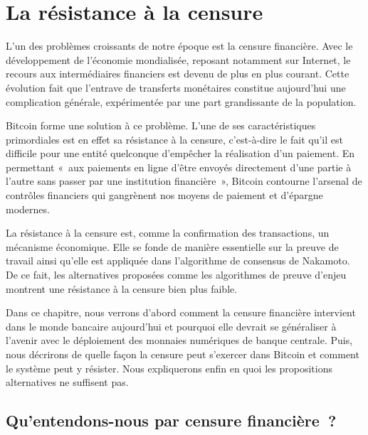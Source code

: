 
\chapter{La résistance à la censure}
\label{ch:censure}

L'un des problèmes croissants de notre époque est la censure financière. Avec le développement de l'économie mondialisée, reposant notamment sur Internet, le recours aux intermédiaires financiers est devenu de plus en plus courant. Cette évolution fait que l'entrave de transferts monétaires constitue aujourd'hui une complication générale, expérimentée par une part grandissante de la population.

Bitcoin forme une solution à ce problème. L'une de ses caractéristiques primordiales est en effet sa résistance à la censure, c'est-à-dire le fait qu'il est difficile pour une entité quelconque d'empêcher la réalisation d'un paiement. En permettant «~aux paiements en ligne d'être envoyés directement d'une partie à l'autre sans passer par une institution financière~», Bitcoin contourne l'arsenal de contrôles financiers qui gangrènent nos moyens de paiement et d'épargne modernes.

La résistance à la censure est, comme la confirmation des transactions, un mécanisme économique. Elle se fonde de manière essentielle sur la preuve de travail ainsi qu'elle est appliquée dans l'algorithme de consensus de Nakamoto. De ce fait, les alternatives proposées comme les algorithmes de preuve d'enjeu montrent une résistance à la censure bien plus faible.

Dans ce chapitre, nous verrons d'abord comment la censure financière intervient dans le monde bancaire aujourd'hui et pourquoi elle devrait se généraliser à l'avenir avec le déploiement des monnaies numériques de banque centrale. Puis, nous décrirons de quelle façon la censure peut s'exercer dans Bitcoin et comment le système peut y résister. Nous expliquerons enfin en quoi les propositions alternatives ne suffisent pas.

\section*{Qu'entendons-nous par censure financière~?}

%

